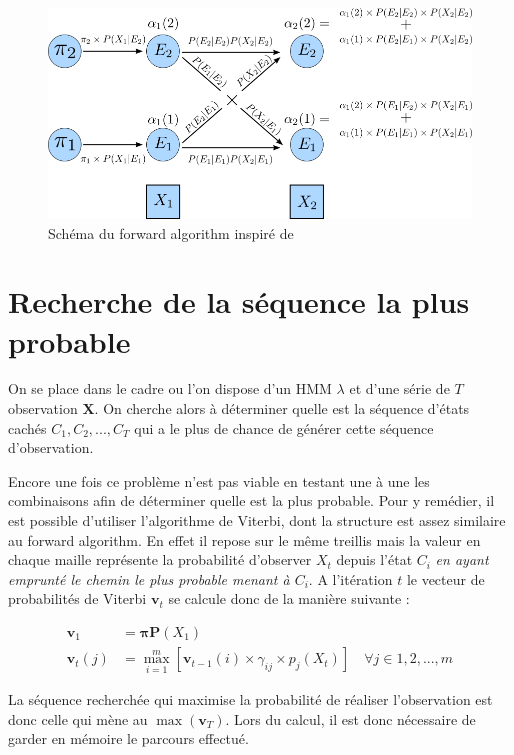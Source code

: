 \documentclass[12pt]{report}
\begin{document}
\begin{figure}[ht]
	\begin{center}
		\includegraphics[width= 0.8 \textwidth]{Images/Models/HMM/Forward.png}
		\caption{Schéma du forward algorithm inspiré de \cite{jurafsky_speech_2017} }
		\label{fig::HMM:ForwardAlgo}
	\end{center}
\end{figure}
		
\section{Recherche de la séquence la plus probable}
		On se place dans le cadre ou l'on dispose d'un HMM $\lambda$ et d'une série de $T$ observation $\bm{X}$. On cherche alors à déterminer quelle est la séquence d'états cachés $C_1,C_2,...,C_T$ qui a le plus de chance de générer cette séquence d'observation.
		
		Encore une fois ce problème n'est pas viable en testant une à une les combinaisons afin de déterminer quelle est la plus probable. Pour y remédier, il est possible d'utiliser l'algorithme de Viterbi, dont la structure est assez similaire au forward algorithm. En effet il repose sur le même treillis mais la valeur en chaque maille représente la probabilité d'observer $X_t$ depuis l'état $C_i$ \textit{en ayant emprunté le chemin le plus probable menant à $C_i$}. A l'itération $t$ le vecteur de probabilités de Viterbi $\bm{v}_t$ se calcule donc de la manière suivante :
		
		\begin{align} 
		\label{eq::HMM:ViterbiAlgo}
		\bm{v}_1 &= \bm{\pi} \bm{P}(X_1) \\ 
		\bm{v}_t(j) &= \max\limits_{i=1}^m \left[ \bm{v}_{t-1}(i) \times \gamma_{ij} \times  p_j(X_t) \right] \quad \forall j \in 1,2,...,m
		\end{align}
		
		La séquence recherchée qui maximise la probabilité de réaliser l'observation est donc celle qui mène au $\max\left(\bm{v}_T\right)$. Lors du calcul, il est donc nécessaire de garder en mémoire le parcours effectué.
		
\end{document}
